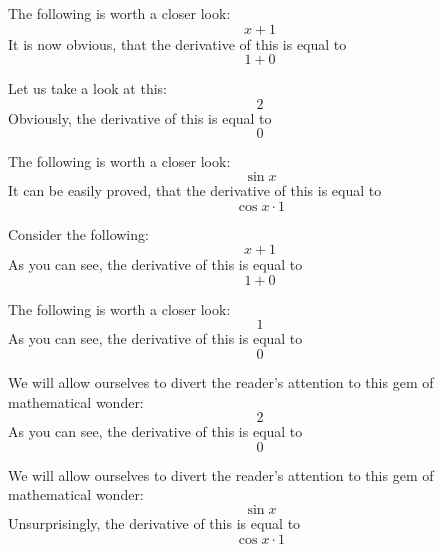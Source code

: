 \documentclass{article}
\begin{document}
The following is worth a closer look:
\begin{equation}
x + 1 
\end{equation}
It is now obvious, that the derivative of this is equal to
\begin{equation}
1 + 0 
\end{equation}

Let us take a look at this:
\begin{equation}
2 
\end{equation}
Obviously, the derivative of this is equal to
\begin{equation}
0 
\end{equation}

The following is worth a closer look:
\begin{equation}
\sin x 
\end{equation}
It can be easily proved, that the derivative of this is equal to
\begin{equation}
\cos x \cdot 1 
\end{equation}

Consider the following:
\begin{equation}
x + 1 
\end{equation}
As you can see, the derivative of this is equal to
\begin{equation}
1 + 0 
\end{equation}

The following is worth a closer look:
\begin{equation}
1 
\end{equation}
As you can see, the derivative of this is equal to
\begin{equation}
0 
\end{equation}

We will allow ourselves to divert the reader's attention to this gem of mathematical wonder:
\begin{equation}
2 
\end{equation}
As you can see, the derivative of this is equal to
\begin{equation}
0 
\end{equation}

We will allow ourselves to divert the reader's attention to this gem of mathematical wonder:
\begin{equation}
\sin x 
\end{equation}
Unsurprisingly, the derivative of this is equal to
\begin{equation}
\cos x \cdot 1 
\end{equation}
\end{document}
